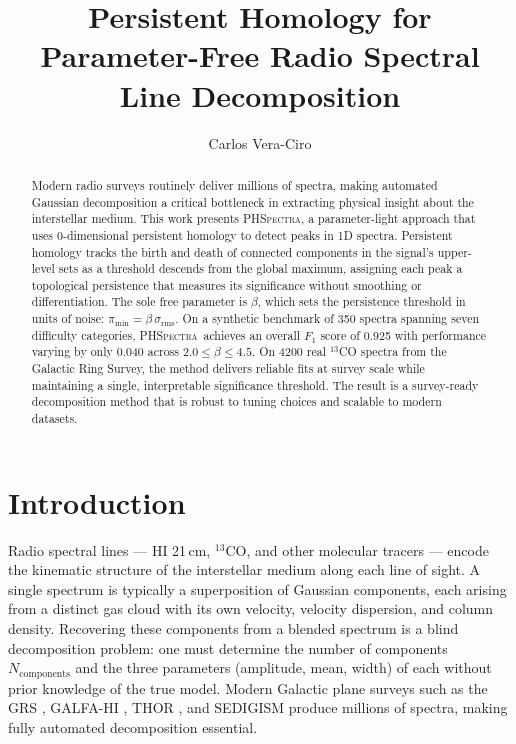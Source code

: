 \documentclass[twocolumn,twocolappendix,aj]{aastex631}
\newcommand{\phspectra}{\textsc{PHSpectra}}
\newcommand{\srms}{\sigma_{\mathrm{rms}}}
\newcommand{\pmin}{\pi_{\mathrm{min}}}
\begin{document}
\title{Persistent Homology for Parameter-Free Radio Spectral Line Decomposition}

\author{Carlos Vera-Ciro}

\begin{abstract}
Modern radio surveys routinely deliver millions of spectra, making automated
Gaussian decomposition a critical bottleneck in extracting physical insight
about the interstellar medium.  This work presents \phspectra, a parameter-light
approach that uses
0-dimensional persistent homology to detect peaks in 1D spectra.
Persistent homology tracks the birth and death of connected components in the
signal's upper-level sets as a threshold descends from the global maximum,
assigning each peak a topological persistence that measures its significance
without smoothing or differentiation.  The sole free parameter is $\beta$,
which sets the persistence threshold in units of noise:
$\pmin = \beta\,\srms$.  On a synthetic benchmark of 350 spectra spanning
seven difficulty categories, \phspectra\ achieves an overall $F_1$ score of
0.925 with performance varying by only 0.040
across $2.0 \leq \beta \leq 4.5$.  On 4200 real ${}^{13}$CO spectra from the
Galactic Ring Survey, the method delivers reliable fits at survey scale while
maintaining a single, interpretable significance threshold.  The result is a
survey-ready decomposition method that is robust to tuning choices and
scalable to modern datasets.
\end{abstract}


\section{Introduction}\label{sec:intro}

Radio spectral lines --- HI 21\,cm, ${}^{13}$CO, and other molecular
tracers --- encode the kinematic structure of the interstellar medium along
each line of sight.  A single spectrum is typically a superposition of
Gaussian components, each arising from a distinct gas cloud with its own
velocity, velocity dispersion, and column density.  Recovering these
components from a blended spectrum is a blind decomposition problem: one
must determine the number of components~$N_{\mathrm{components}}$ and the three parameters
(amplitude, mean, width) of each without prior knowledge of the true model.
Modern Galactic plane surveys such as the GRS \citep{Jackson2006},
GALFA-HI \citep{Peek2018}, THOR \citep{Beuther2016}, and SEDIGISM
\citep{Schuller2021} produce millions of spectra, making fully automated
decomposition essential.
\end{document}
